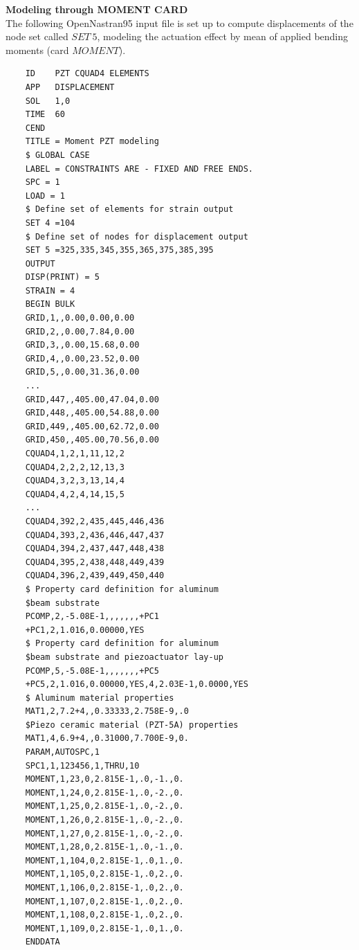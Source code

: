\documentclass[twocolumn,a4paper,10pt,english]{article}
\begin{document}
\medskip
\textbf{Modeling through MOMENT CARD}\\
The following OpenNastran95 input file is set up to compute displacements of the node set called $SET~5$, modeling the actuation effect by mean of applied bending moments (card $MOMENT$).
\begin{verbatim}
	ID    PZT CQUAD4 ELEMENTS 
	APP   DISPLACEMENT                                                          
	SOL   1,0
	TIME  60                                                                                                                                       
	CEND                                                                         
	TITLE = Moment PZT modeling
	$ GLOBAL CASE
	LABEL = CONSTRAINTS ARE - FIXED AND FREE ENDS.
	SPC = 1                                                                      
	LOAD = 1                                                                                                                    
	$ Define set of elements for strain output
	SET 4 =104
	$ Define set of nodes for displacement output
	SET 5 =325,335,345,355,365,375,385,395
	OUTPUT                                                                  
	DISP(PRINT) = 5
	STRAIN = 4                                                
	BEGIN BULK   
	GRID,1,,0.00,0.00,0.00
	GRID,2,,0.00,7.84,0.00
	GRID,3,,0.00,15.68,0.00
	GRID,4,,0.00,23.52,0.00
	GRID,5,,0.00,31.36,0.00
	...
	GRID,447,,405.00,47.04,0.00
	GRID,448,,405.00,54.88,0.00
	GRID,449,,405.00,62.72,0.00
	GRID,450,,405.00,70.56,0.00
	CQUAD4,1,2,1,11,12,2
	CQUAD4,2,2,2,12,13,3
	CQUAD4,3,2,3,13,14,4
	CQUAD4,4,2,4,14,15,5
	...
	CQUAD4,392,2,435,445,446,436
	CQUAD4,393,2,436,446,447,437
	CQUAD4,394,2,437,447,448,438
	CQUAD4,395,2,438,448,449,439
	CQUAD4,396,2,439,449,450,440 
	$ Property card definition for aluminum 
	$beam substrate
	PCOMP,2,-5.08E-1,,,,,,,+PC1
	+PC1,2,1.016,0.00000,YES
	$ Property card definition for aluminum 
	$beam substrate and piezoactuator lay-up
	PCOMP,5,-5.08E-1,,,,,,,+PC5
	+PC5,2,1.016,0.00000,YES,4,2.03E-1,0.0000,YES
	$ Aluminum material properties
	MAT1,2,7.2+4,,0.33333,2.758E-9,.0
	$Piezo ceramic material (PZT-5A) properties
	MAT1,4,6.9+4,,0.31000,7.700E-9,0. 
	PARAM,AUTOSPC,1 
	SPC1,1,123456,1,THRU,10
	MOMENT,1,23,0,2.815E-1,.0,-1.,0.
	MOMENT,1,24,0,2.815E-1,.0,-2.,0.
	MOMENT,1,25,0,2.815E-1,.0,-2.,0.
	MOMENT,1,26,0,2.815E-1,.0,-2.,0.
	MOMENT,1,27,0,2.815E-1,.0,-2.,0.
	MOMENT,1,28,0,2.815E-1,.0,-1.,0.
	MOMENT,1,104,0,2.815E-1,.0,1.,0.
	MOMENT,1,105,0,2.815E-1,.0,2.,0.
	MOMENT,1,106,0,2.815E-1,.0,2.,0.
	MOMENT,1,107,0,2.815E-1,.0,2.,0.
	MOMENT,1,108,0,2.815E-1,.0,2.,0.
	MOMENT,1,109,0,2.815E-1,.0,1.,0.
	ENDDATA
\end{verbatim}
\end{document}

